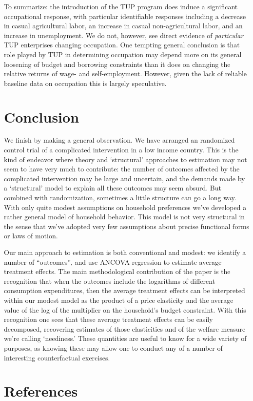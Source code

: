 \documentclass[11pt]{article}
\begin{document}
To summarize: the introduction of the TUP program does induce a
significant occupational response, with particular identifiable
responses including a decrease in casual agricultural labor, an
increase in casual non-agricultural labor, and an increase in
unemployment.  We do not, however, see direct evidence of \emph{particular}
TUP enterprises changing occupation. One tempting general conclusion
is that role played by TUP in determining occupation may depend more
on its general loosening of budget and borrowing constraints than it
does on changing the relative returns of wage- and self-employment.
However, given the lack of reliable baseline data on occupation this is largely
speculative. 

\section*{Conclusion}
\label{sec-9}

We finish by making a general observation.  We have arranged an
randomized control trial of a complicated intervention in a low income
country.  This is the kind of endeavor where theory and `structural'
approaches to estimation may not seem to have very much to contribute:
the number of outcomes affected by the complicated intervention may be
large and uncertain, and the demands made by a `structural' model to
explain all these outcomes may seem absurd.  But combined with
randomization, sometimes a little structure can go a long way.  With
only quite modest assumptions on household preferences we've developed
a rather general model of household behavior.  This model is 
not very structural in the sense that we've adopted very few
assumptions about precise functional forms or laws of motion.  

Our main approach to estimation is both conventional and modest: we
identify a number of ``outcomes'', and use ANCOVA regression to estimate
average treatment effects.  The main methodological contribution of
the paper is the recognition that when the outcomes include the
logarithms of different consumption expenditures, then the average
treatment effects can be interpreted within our modest model as the
product of a price elasticity and the average value of the log of the
multiplier on the household's budget constraint.  With this
recognition one sees that these average treatment effects can be
easily decomposed, recovering estimates of those elasticities and of
the welfare measure we're calling `neediness.'  These quantities are
useful to know for a wide variety of purposes, as knowing these may
allow one to conduct any of a number of interesting counterfactual
exercises.

\section*{References}
\label{sec-10}
\renewcommand{\refname}{}
\printbibliography
\end{document}
